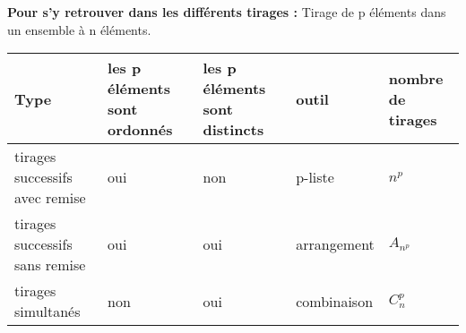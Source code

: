  
 \textbf{Pour s'y retrouver dans les différents tirages :}
 Tirage de p éléments dans un ensemble à n éléments.
 \begin{center}

 \begin{tabularx}{\textwidth}{|X|X|X|X|X|}
\hline
Type & les p éléments sont ordonnés&  les p éléments sont distincts& outil&nombre de tirages\\
\hline
tirages successifs avec remise  &   oui  & non &p-liste & $ n^{p} $ \\
\hline
tirages successifs sans remise  &  oui&   oui &  arrangement& $ A_{n^{p}} $\\
\hline
tirages simultanés \par & non  & oui &combinaison& $C_{n}^{p}$\\
\hline
\end{tabularx}
\end{center}




